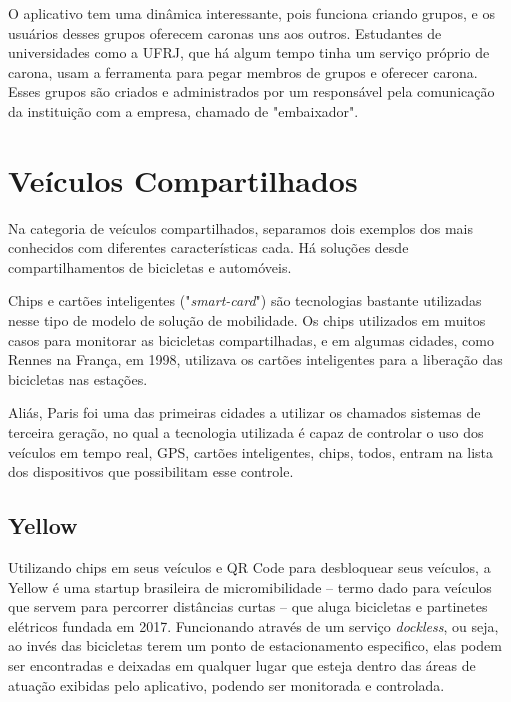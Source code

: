 O aplicativo tem uma dinâmica interessante, pois funciona criando grupos, e os usuários desses grupos oferecem caronas uns aos outros. Estudantes de universidades como a UFRJ, que há algum tempo tinha um serviço próprio de carona, usam a ferramenta para pegar membros de grupos e oferecer carona. Esses grupos são criados e administrados por um responsável pela comunicação da instituição com a empresa, chamado de "embaixador".




\section{Veículos Compartilhados}
Na categoria de veículos compartilhados, separamos dois exemplos dos mais conhecidos com diferentes características cada. Há soluções desde compartilhamentos de bicicletas e automóveis.  %

Chips e cartões inteligentes ("\textit{smart-card}") são tecnologias bastante utilizadas nesse tipo de modelo de solução de mobilidade. Os chips utilizados em muitos casos para monitorar as bicicletas compartilhadas, e em algumas cidades, como Rennes na França, em 1998, utilizava os cartões inteligentes para a liberação das bicicletas nas estações.%

Aliás, Paris foi uma das primeiras cidades a utilizar os chamados sistemas de terceira geração, no qual a tecnologia utilizada é capaz de controlar o uso dos veículos em tempo real, GPS, cartões inteligentes, chips, todos, entram na lista dos dispositivos que possibilitam esse controle.

\subsection{Yellow}

Utilizando chips em seus veículos e QR Code para desbloquear seus veículos, a Yellow é uma startup brasileira de micromibilidade -- termo dado para veículos que servem para percorrer distâncias curtas -- que aluga bicicletas e partinetes elétricos fundada em 2017. Funcionando através de um serviço \textit{dockless}, ou seja, ao invés das bicicletas terem um ponto de estacionamento especifico, elas podem ser encontradas e deixadas em qualquer lugar que esteja dentro das áreas de atuação exibidas pelo aplicativo, podendo ser monitorada e controlada. 

